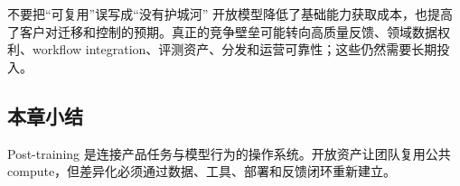\begin{warningbox}{不要把“可复用”误写成“没有护城河”}
开放模型降低了基础能力获取成本，也提高了客户对迁移和控制的预期。真正的竞争壁垒可能转向高质量反馈、领域数据权利、workflow integration、评测资产、分发和运营可靠性；这些仍然需要长期投入。
\end{warningbox}

\subsection{本章小结}

Post-training 是连接产品任务与模型行为的操作系统。开放资产让团队复用公共 compute，但差异化必须通过数据、工具、部署和反馈闭环重新建立。

